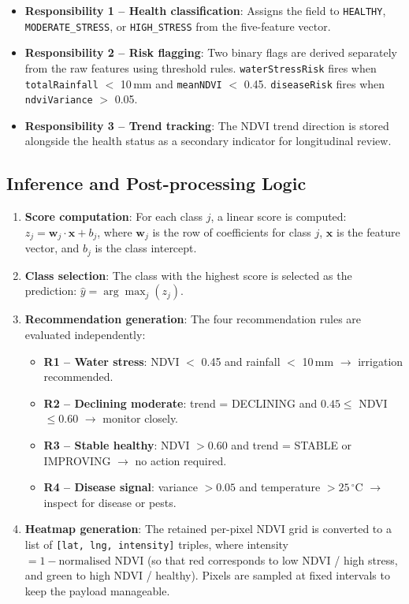 \begin{itemize}
  \item \textbf{Responsibility 1 -- Health classification}: Assigns the field to \texttt{HEALTHY}, \texttt{MODERATE\_STRESS}, or \texttt{HIGH\_STRESS} from the five-feature vector.
  \item \textbf{Responsibility 2 -- Risk flagging}: Two binary flags are derived separately from the raw features using threshold rules. \texttt{waterStressRisk} fires when \texttt{totalRainfall} $<$ 10\,mm and \texttt{meanNDVI} $<$ 0.45. \texttt{diseaseRisk} fires when \texttt{ndviVariance} $>$ 0.05.
  \item \textbf{Responsibility 3 -- Trend tracking}: The NDVI trend direction is stored alongside the health status as a secondary indicator for longitudinal review.
\end{itemize}

\subsection{Inference and Post-processing Logic}

\begin{enumerate}
  \item \textbf{Score computation}: For each class $j$, a linear score is computed: $z_j = \mathbf{w}_j \cdot \mathbf{x} + b_j$, where $\mathbf{w}_j$ is the row of coefficients for class $j$, $\mathbf{x}$ is the feature vector, and $b_j$ is the class intercept.
  \item \textbf{Class selection}: The class with the highest score is selected as the prediction: $\hat{y} = \arg\max_j(z_j)$.
  \item \textbf{Recommendation generation}: The four recommendation rules are evaluated independently:
    \begin{itemize}
      \item[-] \textbf{R1 -- Water stress}: NDVI $<$ 0.45 and rainfall $<$ 10\,mm $\rightarrow$ irrigation recommended.
      \item[-] \textbf{R2 -- Declining moderate}: trend = DECLINING and $0.45 \leq$ NDVI $\leq 0.60$ $\rightarrow$ monitor closely.
      \item[-] \textbf{R3 -- Stable healthy}: NDVI $> 0.60$ and trend = STABLE or IMPROVING $\rightarrow$ no action required.
      \item[-] \textbf{R4 -- Disease signal}: variance $> 0.05$ and temperature $> 25\,^{\circ}$C $\rightarrow$ inspect for disease or pests.
    \end{itemize}
  \item \textbf{Heatmap generation}: The retained per-pixel NDVI grid is converted to a list of \texttt{[lat, lng, intensity]} triples, where intensity $= 1 - \text{normalised NDVI}$ (so that red corresponds to low NDVI / high stress, and green to high NDVI / healthy). Pixels are sampled at fixed intervals to keep the payload manageable.
\end{enumerate}

